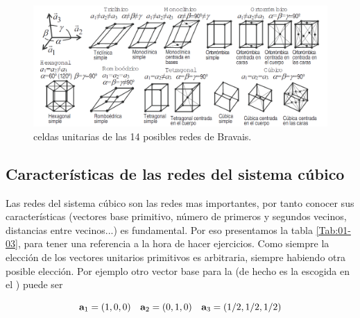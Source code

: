 \begin{figure}[h!] \centering
    \includegraphics[scale=0.55]{Cuerpo/Ch_01/Redes_bravais.png}
    \caption{celdas unitarias de las 14 posibles redes de Bravais.}
    \label{Fig:01-03}
\end{figure}

\subsection{Características de las redes del sistema cúbico}

Las redes del sistema cúbico son las redes mas importantes, por tanto conocer sus características (vectores base primitivo, número de primeros y segundos vecinos, distancias entre vecinos...) es fundamental. Por eso presentamos la tabla \ref{Tab:01-03}, para tener una referencia a la hora de hacer ejercicios. Como siempre la elección de los vectores unitarios primitivos es arbitraria, siempre habiendo otra posible elección. Por ejemplo otro vector base para la \bcc (de hecho es la escogida en el \cite{Oxford_Solid_State}) puede ser

\begin{equation}
	\mathbf{a}_1 = (1,0,0) \quad \mathbf{a}_2 = (0,1,0) \quad \mathbf{a}_3 = (1/2,1/2,1/2) 
\end{equation}

